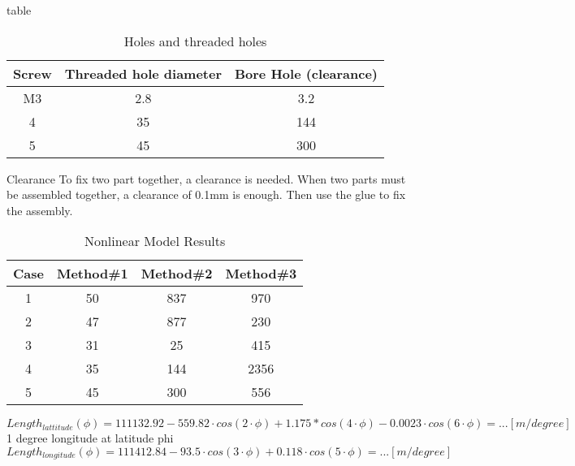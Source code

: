 \documentclass[12pt,a4paper]{article}
\begin{document}
	
	\newpage	
	
	table
	
	\begin{table}[ht]
		\caption{Holes and threaded holes} %
		\centering %
		\begin{tabular}{c c c} %
			\hline\hline %
			Screw & Threaded hole diameter & Bore Hole (clearance) \\ [0.5ex] %
			\hline %
			M3 & 2.8 & 3.2 \\ %
			4 & 35 & 144 \\
			5 & 45 & 300 \\ [1ex] %
			\hline %
		\end{tabular}\label{table:nonlin} %
	\end{table}
	
	Clearance
	To fix two part together, a clearance is needed.
	When two parts must be assembled together, a clearance of 0.1mm is enough. Then use the glue to fix the assembly. 
	
	
	
	\begin{table}[ht]
		\caption{Nonlinear Model Results} %
		\centering %
		\begin{tabular}{c c c c} %
			\hline\hline %
			Case & Method\#1 & Method\#2 & Method\#3 \\ [0.5ex] %
			\hline %
			1 & 50 & 837 & 970 \\ %
			2 & 47 & 877 & 230 \\
			3 & 31 & 25 & 415 \\
			4 & 35 & 144 & 2356 \\
			5 & 45 & 300 & 556 \\ [1ex] %
			\hline %
		\end{tabular}\label{table:nonlin} %
	\end{table}
	
	
	
	\begin{equation}
		Length_{lattitude}(\phi) = 111132.92-559.82 \cdot cos(2 \cdot \phi)+1.175*cos(4 \cdot \phi)-0.0023 \cdot cos(6 \cdot \phi)= ... [m/degree]
	\end{equation}
	1 degree longitude at latitude phi
	\begin{equation}
		Length_{longitude}(\phi) =
		111412.84-93.5 \cdot cos(3 \cdot \phi)+ 0.118 \cdot cos(5 \cdot \phi)= ... [m/degree]
	\end{equation}
	
\end{document}
